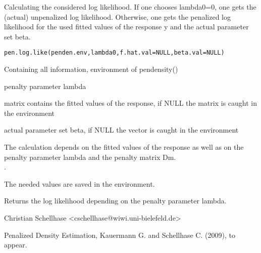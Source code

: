 \begin{Description}\relax
Calculating the considered log likelihood. If one chooses lambda0=0, one gets the (actual) unpenalized log likelihood. Otherwise, one gets the penalized log likelihood for the used fitted values of the response y and the actual parameter set beta.
\end{Description}
\begin{Usage}
\begin{verbatim}
pen.log.like(penden.env,lambda0,f.hat.val=NULL,beta.val=NULL)
\end{verbatim}
\end{Usage}
\begin{Arguments}
\begin{ldescription}
\item[\code{penden.env}] Containing all information, environment of pendensity()
\item[\code{lambda0}] penalty parameter lambda
\item[\code{f.hat.val}] matrix contains the fitted values of the response, if NULL the matrix is caught in the environment
\item[\code{beta.val}] actual parameter set beta, if NULL the vector is caught in the environment
\end{ldescription}
\end{Arguments}
\begin{Details}\relax
The calculation depends on the fitted values of the response as well as on the penalty parameter lambda and the penalty matrix Dm.\\
.

The needed values are saved in the environment.
\end{Details}
\begin{Value}
Returns the log likelihood depending on the penalty parameter lambda.
\end{Value}
\begin{Author}\relax
Christian Schellhase <cschellhase@wiwi.uni-bielefeld.de>
\end{Author}
\begin{References}\relax
Penalized Density Estimation, Kauermann G. and Schellhase C. (2009), to appear.
\end{References}

